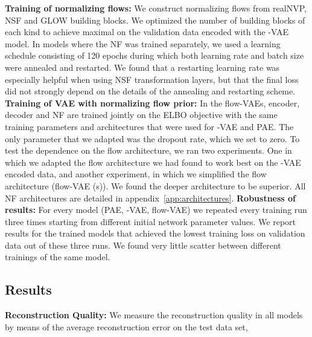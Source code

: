 \documentclass[10pt]{article} \usepackage[accepted]{tmlr}
\begin{document}
\newline
\textbf{Training of normalizing flows:}
We construct normalizing flows from realNVP, NSF and GLOW building blocks. We optimized the number of building blocks of each kind to achieve maximal  on the validation data encoded with the -VAE model. In models where the NF was trained separately, we used a learning schedule consisting of 120 epochs during which both learning rate and batch size were annealed and restarted. We found that a restarting learning rate was especially helpful when using NSF transformation layers, but that the final loss did not strongly depend on the details of the annealing and restarting scheme. 
\newline
\textbf{Training of VAE with normalizing flow prior:}
In the flow-VAEs, encoder, decoder and NF are trained jointly on the ELBO objective with the same training parameters and architectures that were used for -VAE and PAE. The only parameter that we adapted was the dropout rate, which we set to zero. To test the dependence on the flow architecture, we ran two experiments. One in which we adapted the flow architecture we had found to work best on the -VAE encoded data, and another experiment, in which we simplified the flow architecture (flow-VAE (s)). We found the deeper architecture to be superior. All NF architectures are detailed in appendix~\ref{app:architectures}.
\newline
\textbf{Robustness of results:}
For every model (PAE, -VAE, flow-VAE) we repeated every training run three times starting from different initial network parameter values. We report results for the trained models that achieved the lowest training loss on validation data out of these three runs. We found very little scatter between different trainings of the same model.

\subsection{Results}
\label{sec:results}
\textbf{Reconstruction Quality:} We measure the reconstruction quality in all models by means of the average reconstruction error on the test data set,
\end{document}
